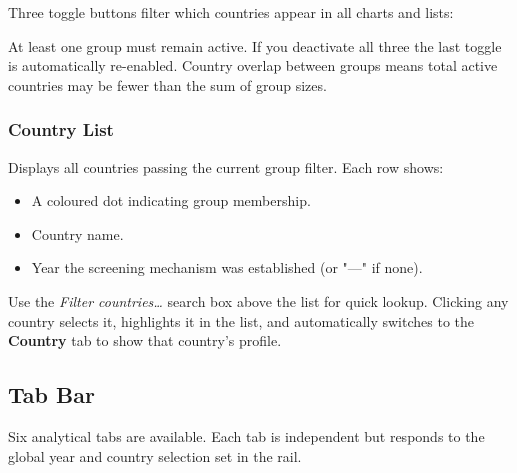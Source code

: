 \documentclass[12pt,a4paper]{article}
\newcommand{\badge}[2]{%
  \colorbox{#1}{\color{white}\footnotesize\textbf{\strut\,#2\,}}%
}
\newcommand{\tabname}[1]{\textbf{\color{prismblue}#1}}
\newcommand{\uielem}[1]{\textit{#1}}
\begin{document}
Three toggle buttons filter which countries appear in all charts and lists:


\begin{warnbox}[Important]
At least one group must remain active. If you deactivate all three the last toggle is automatically re-enabled. Country overlap between groups means total active countries may be fewer than the sum of group sizes.
\end{warnbox}

\subsubsection{Country List}

Displays all countries passing the current group filter. Each row shows:
\begin{itemize}
  \item A coloured dot indicating group membership.
  \item Country name.
  \item Year the screening mechanism was established (or "—" if none).
\end{itemize}

Use the \uielem{Filter countries\ldots} search box above the list for quick lookup. Clicking any country selects it, highlights it in the list, and automatically switches to the \tabname{Country} tab to show that country's profile.

\subsection{Tab Bar}

Six analytical tabs are available. Each tab is independent but responds to the global year and country selection set in the rail.
\end{document}
